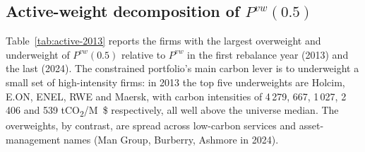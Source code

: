 \documentclass[11pt,a4paper]{article}
\begin{document}
\subsection{Active-weight decomposition of $P^{vw}(0.5)$}\label{sec:active}

Table~\ref{tab:active-2013} reports the firms with the largest
overweight and underweight of $P^{vw}(0.5)$ relative to $P^{vw}$ in
the first rebalance year (2013) and the last (2024). The constrained
portfolio's main carbon lever is to underweight a small set of
high-intensity firms: in 2013 the top five underweights are Holcim,
E.ON, ENEL, RWE and Maersk, with carbon intensities of
4\,279, 667, 1\,027, 2\,406 and 539 \si{tCO_2/M\$} respectively, all
well above the universe median. The overweights, by contrast, are
spread across low-carbon services and asset-management names (Man
Group, Burberry, Ashmore in 2024).
\end{document}
